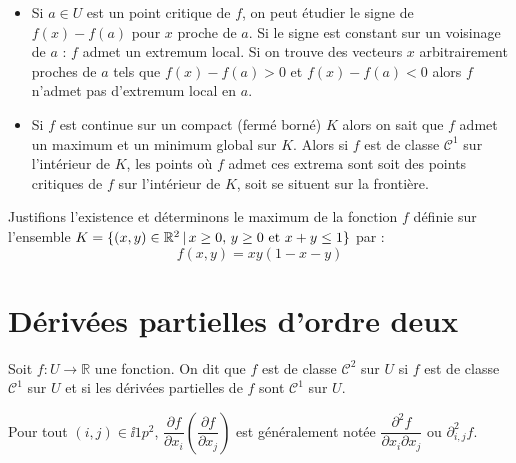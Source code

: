 \documentclass[french,11pt,twoside]{VcCours}
\begin{document}
\medskip

\begin{itemize}
\item Si $a \in U$ est un point critique de $f$, on peut étudier le signe de $f(x)-f(a)$ pour $x$ proche de $a$. Si le signe est constant sur un voisinage de $a$ : $f$ admet un extremum local. Si on trouve des vecteurs $x$ arbitrairement proches de $a$ tels que $f(x)-f(a)>0$ et $f(x)-f(a)<0$ alors $f$ n'admet pas d'extremum local en $a$.
\item Si $f$ est continue sur un compact (fermé borné) $K$ alors on sait que $f$ admet un maximum et un minimum global sur $K$. Alors si $f$ est de classe $\mathcal{C}^1$ sur l'intérieur de $K$, les points où $f$ admet ces extrema sont soit des points critiques de $f$ sur l'intérieur de $K$, soit se situent sur la frontière.
\end{itemize}

\medskip

\begin{Exemple}{} Justifions l'existence et déterminons le maximum de la fonction $f$ définie sur l'ensemble $K=\lbrace (x,y) \in \mathbb{R}^2  \, \vert \, x \geq 0, \,  y \geq 0 \hbox{ et } x+y \leq 1\rbrace$ par : 
  \[
  f(x,y) = xy(1-x-y)
  \]





  
  \vspace{10cm}
\end{Exemple}


\section{Dérivées partielles d'ordre deux}

\begin{Definition}{} Soit $f : U \rightarrow \mathbb{R}$ une fonction. On dit que $f$ est de classe $\mathcal{C}^2$ sur $U$ si $f$ est de classe $\mathcal{C}^1$ sur $U$ et si les dérivées partielles de $f$ sont $\mathcal{C}^1$ sur $U$.
\end{Definition}

Pour tout $(i,j) \in \ii{1}{p}^2$, $\dfrac{\partial f}{\partial x_i} \left( \dfrac{\partial f}{\partial x_j} \right)$ est généralement notée $\dfrac{\partial^2 f}{\partial x_i \partial x_j}$ ou $\partial^2_{i,j} f$.
\end{document}
